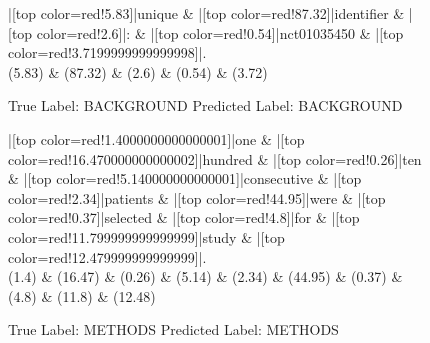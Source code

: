\documentclass[a4paper, landscape]{article}
\begin{document}
\clearpage
\begin{figure}
\begin{center}
\begin{dependency}
\begin{deptext}
|[top color=red!5.83]|unique \& |[top color=red!87.32]|identifier \& |[top color=red!2.6]|: \& |[top color=red!0.54]|nct01035450 \& |[top color=red!3.7199999999999998]|.\\
(5.83) \& (87.32) \& (2.6) \& (0.54) \& (3.72)\\
\end{deptext}
\end{dependency}
\end{center}
\caption{True Label: BACKGROUND Predicted Label: BACKGROUND}
\end{figure}
\clearpage
\begin{figure}
\begin{center}
\begin{dependency}
\begin{deptext}
|[top color=red!1.4000000000000001]|one \& |[top color=red!16.470000000000002]|hundred \& |[top color=red!0.26]|ten \& |[top color=red!5.140000000000001]|consecutive \& |[top color=red!2.34]|patients \& |[top color=red!44.95]|were \& |[top color=red!0.37]|selected \& |[top color=red!4.8]|for \& |[top color=red!11.799999999999999]|study \& |[top color=red!12.479999999999999]|.\\
(1.4) \& (16.47) \& (0.26) \& (5.14) \& (2.34) \& (44.95) \& (0.37) \& (4.8) \& (11.8) \& (12.48)\\
\end{deptext}
\end{dependency}
\end{center}
\caption{True Label: METHODS Predicted Label: METHODS}
\end{figure}
\clearpage
\end{document}
